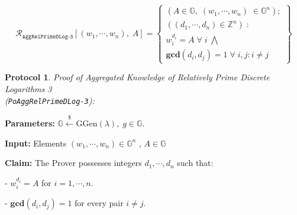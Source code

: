 \documentclass[11pt, lettersize, notitlepage, leqno, footskip=0.6cm]{article}
\newcommand{\bz}{\mathbb Z}
\newcommand{\ttt}{\texttt}
\newcommand{\mc}{\mathcal}
\newcommand{\mb}{\mathbb}
\newcommand{\mbf}{\mathbf}
\newcommand{\mr}{\mathrm}
\newcommand{\lamb}{\lambda}
\newcommand{\GCD}{\mbf{gcd}}
\newtheorem{Prot}[Thm]{Protocol}
\numberwithin{equation}{section}
\begin{document}
\[
  \mc{R}_{\ttt{AggRelPrimeDLog-3}}[(w_1,\cdots, w_n),\; A] = \left\{\begin{array}{l}
    (A\in\mb{G},\; (w_1,\cdots, w_n)\;\in\mb{G}^n);\\
    ((d_1,\cdots,d_n)\in\bz^n)\;: \\
    w_i^{d_i} = A\;\forall\; i\;\bigwedge\\
   	\GCD(d_i, d_j) = 1\;\forall \;i,j: i\neq j
  \end{array}\right\}
\] 

\vspace{0.1cm}



\begin{Prot} \normalfont \hypertarget{RP3}{\textit{Proof of Aggregated Knowledge of Relatively Prime Discrete Logarithms} 3}\\ (\verb|PoAggRelPrimeDLog-3|):\end{Prot} \vspace{-0.3cm}

\noindent \textbf{Parameters:} $\mb{G}\xleftarrow{\$} \mr{GGen}(\lamb), \; g\in \mb{G}$.

\noindent \textbf{Input:} Elements $(w_1,\cdots, w_n)\in \mb{G}^n$ , $A\in\mb{G}$

\noindent \textbf{Claim:} The Prover possesses integers $ d_1,\cdots, d_n$ such that:

\noindent - $w_i^{d_i} = A$ for $i = 1,\cdots,n$.

\noindent - $\GCD(d_i, d_j) = 1$ for every pair $i\neq j$.
\end{document}
